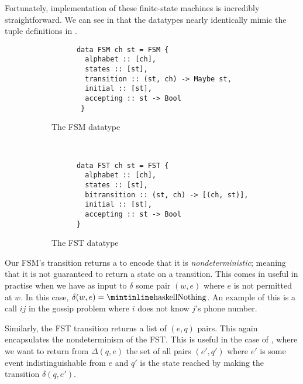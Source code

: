 \documentclass[10pt, a4paper]{report}
\begin{document}
Fortunately, implementation of these finite-state machines is incredibly
straightforward. We can see in  that the datatypes nearly
identically mimic the tuple definitions in .


\begin{figure}[h]
  \centering
  \begin{subfigure}[b]{0.5\textwidth}
    \begin{verbatim}
      data FSM ch st = FSM {
        alphabet :: [ch],              
        states :: [st],               
        transition :: (st, ch) -> Maybe st,
        initial :: [st],            
        accepting :: st -> Bool    
       }
    \end{verbatim}
    \caption{The FSM datatype}
  \end{subfigure}%
~
  \begin{subfigure}[b]{0.5\textwidth}
    \begin{verbatim}
      data FST ch st = FST {
        alphabet :: [ch],                     
        states :: [st],                       
        bitransition :: (st, ch) -> [(ch, st)],
        initial :: [st],                      
        accepting :: st -> Bool              
      }
    \end{verbatim}
    \caption{The FST datatype}
  \end{subfigure}
  \caption{}
  \label{fig:FSMFST}
\end{figure}

Our FSM's transition returns a  to encode that it is
\emph{nondeterministic}; meaning that it is not guaranteed to return a state
on a transition. This comes in useful in practise when we have as input to
$\delta$ some pair $(w, e)$ where $e$ is not permitted at $w$. In this case,
$\delta(w, e) = \text{\mih{Nothing}}$. An example of this is a call $ij$ in the
gossip problem where $i$ does not know $j$'s phone number.

Similarly, the FST transition returns a list of $(e, q)$ pairs. This again
encapsulates the nondeterminism of the FST. This is useful in the case of
, where we want to return from
$\Delta(q, e)$ the set of all pairs $(e', q')$ where $e'$ is some event
indistinguishable from $e$ and $q'$ is the state reached by making the
transition $\delta(q, e')$.
\end{document}
